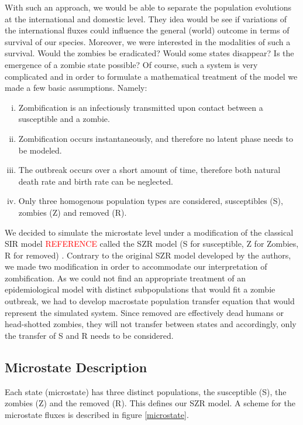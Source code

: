\documentclass[11pt]{article} %
\begin{document}
With such an approach, we would be able to separate the population evolutions at the international and domestic level. They idea would be see if variations of the international fluxes could influence the general (world) outcome in terms of survival of our species. Moreover, we were interested in the modalities of such a survival. Would the zombies be eradicated? Would some states disappear? Is the emergence of a zombie state possible? Of course, such a system is very complicated and in order to formulate a mathematical treatment of the model we made a few basic assumptions. Namely:
\begin{enumerate}[i.]
	\item Zombification is an infectiously transmitted upon contact between a susceptible and a zombie.
	\item Zombification occurs instantaneously, and therefore no latent phase needs to be modeled.
	\item The outbreak occurs over a short amount of time, therefore both natural death rate and birth rate can be neglected.
	\item Only three homogenous population types are considered, susceptibles (S), zombies (Z) and removed (R).
\end{enumerate}

We decided to simulate the microstate level under a modification of the classical SIR model \textcolor{red}{REFERENCE} called the SZR model (S for susceptible, Z for Zombies, R for removed) \cite{munz2009zombies}. Contrary to the original SZR model developed by the authors, we made two modification in order to accommodate our interpretation of zombification. As we could not find an appropriate treatment of an epidemiological model with distinct subpopulations that would fit a zombie outbreak, we had to develop macrostate population transfer equation that would represent the simulated system. Since removed are effectively dead humans or head-shotted zombies, they will not transfer between states and accordingly, only the transfer of S and R needs to be considered. 

\subsection{Microstate Description}\indent

Each state (microstate) has three distinct populations, the susceptible (S), the zombies (Z) and the removed (R). This defines our SZR model. A scheme for the microstate fluxes is described in figure \ref{microstate}.
\end{document}
